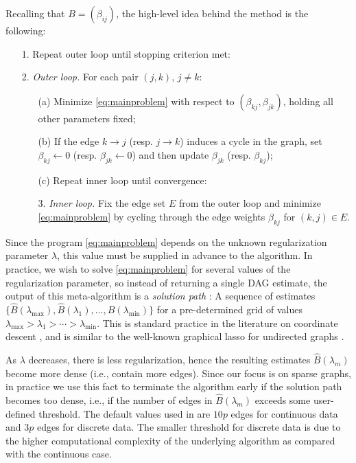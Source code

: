 \documentclass[article]{jss}
\newcommand{\dagmat}{B}
\newcommand{\dagcomp}{\beta}
\newcommand{\dagest}{\widehat{\dagmat}}
\renewcommand{\|}{\,|\,}
\begin{document}
Recalling that $\dagmat=(\dagcomp_{ij})$, the high-level idea behind the method is the following:

    \begin{itemize}[leftmargin=5mm, itemsep=0mm]
    \item[1.] Repeat outer loop until stopping criterion met:
    \item[2.] \emph{Outer loop.} For each pair $(j,k)$, $j\ne k$:
    \begin{itemize}[leftmargin=3mm, itemsep=0mm]
    \item[(a)] Minimize \eqref{eq:mainproblem} with respect to $(\beta_{kj},\beta_{jk})$, holding all other parameters fixed; %
    \item[(b)] If the edge $k\to j$ (resp. $j\to k$) induces a cycle in the graph, set ${\beta}_{kj}\leftarrow 0$
    (resp. ${\beta}_{jk}\leftarrow 0$) and then update $\beta_{jk}$ (resp. $\beta_{kj}$);
    \item[(c)] Repeat inner loop until convergence:
    \end{itemize}
    \begin{itemize}[itemsep=0mm]
    \item[3.] \emph{Inner loop.}
    Fix the edge set $E$ from the outer loop and minimize \eqref{eq:mainproblem} by cycling through the edge weights $\beta_{kj}$ for $(k,j)\in E$.
    \end{itemize}
    \end{itemize}

Since the program \eqref{eq:mainproblem} depends on the unknown regularization parameter $\lambda$, this value must be supplied in advance to the algorithm. In practice, we wish to solve \eqref{eq:mainproblem} for several values of the regularization parameter, so instead of returning a single DAG estimate, the output of this meta-algorithm is a \emph{solution path} \citep[also called a \emph{regularization path},][]{friedman2010}: A sequence of estimates $\{\dagest(\lambda_{\max}),\dagest(\lambda_{1}),\ldots,\dagest(\lambda_{\min})\}$ for a pre-determined grid of values $\lambda_{\max}>\lambda_{1}>\cdots>\lambda_{\min}$. This is standard practice in the literature on coordinate descent \citep{friedman2007,wu2008}, and is similar to the well-known graphical lasso for undirected graphs \citep{friedman2008}.

As $\lambda$ decreases, there is less regularization, hence the resulting estimates $\dagest(\lambda_{m})$ become more dense (i.e., contain more edges). Since our focus is on sparse graphs, in practice we use this fact to terminate the algorithm early if the solution path becomes too dense, i.e., if the number of edges in $\dagest(\lambda_{m})$ exceeds some user-defined threshold. The default values used in  are $10p$ edges for continuous data and $3p$ edges for discrete data. The smaller threshold for discrete data is due to the higher computational complexity of the underlying algorithm as compared with the continuous case.
\end{document}
